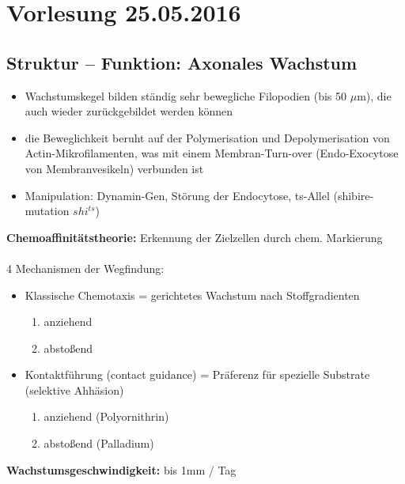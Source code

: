 \section{Vorlesung 25.05.2016}

\subsection{Struktur -- Funktion: Axonales Wachstum}

\begin{itemize}
	\item Wachstumskegel bilden ständig sehr bewegliche Filopodien (bis 50 $\mu$m), die auch wieder zurückgebildet werden können
	\item die Beweglichkeit beruht auf der Polymerisation und Depolymerisation von Actin-Mikrofilamenten, was mit einem Membran-Turn-over (Endo-Exocytose von Membranvesikeln) verbunden ist
	\item Manipulation: Dynamin-Gen, Störung der Endocytose, ts-Allel (shibire-mutation $shi^{ts}$)
\end{itemize}

\textbf{Chemoaffinitätstheorie:} Erkennung der Zielzellen durch chem. Markierung\\\\
4 Mechanismen der Wegfindung:
\begin{itemize}
	\item Klassische Chemotaxis = gerichtetes Wachstum nach Stoffgradienten
	\begin{enumerate}
		\item anziehend
		\item abstoßend
	\end{enumerate}
	\item Kontaktführung (contact guidance) = Präferenz für spezielle Substrate (selektive Ahhäsion)
	\begin{enumerate}[resume]
		\item anziehend (Polyornithrin)
		\item abstoßend (Palladium)
	\end{enumerate}
\end{itemize}

\textbf{Wachstumsgeschwindigkeit:} bis 1mm / Tag

